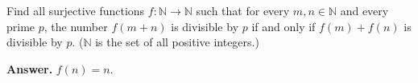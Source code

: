 Find all surjective functions $f : \mathbb{N} \to \mathbb{N}$ such that for every $m, n \in \mathbb{N}$ and every prime $p$, the number $f(m + n)$ is divisible by $p$ if and only if $f(m) + f(n)$ is divisible by $p$. ($\mathbb{N}$ is the set of all positive integers.)

\textbf{Answer.} $f(n) = n$.
